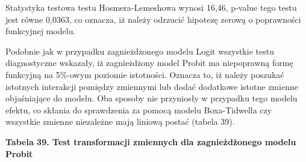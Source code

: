 Statystyka testowa testu Hosmera-Lemeshowa wynosi 16,46, p-value tego testu jest równe 0,0363, co oznacza, iż należy odrzucić hipotezę zerową o poprawności funkcyjnej modelu.

Podobnie jak w przypadku zagnieżdżonego modelu Logit wszystkie testu diagnostyczne wskazały, iż zagnieżdżony model Probit ma niepoprawną formę funkcyjną na 5\%-owym poziomie istotności. Oznacza to, iż należy poszukać istotnych interakcji pomiędzy zmiennymi lub dodać dodatkowe istotne zmienne objaśniające do modelu. Oba sposoby nie przyniosły w przypadku tego modelu efektu, co skłania do sprawdzenia za pomocą modelu Boxa-Tidwella czy wszystkie zmienne niezależne mają liniową postać (tabela 39).

\vspace{0.5cm}
\textbf{Tabela 39. Test transformacji zmiennych dla zagnieżdżonego modelu Probit}
